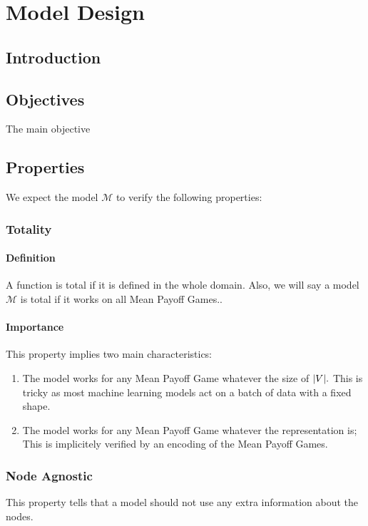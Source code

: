 \chapter{Model Design}
\label{section:ModelDesign}

\section{Introduction}

\section{Objectives}
The main objective

\section{Properties}
\label{section:ModelDesign:Properties}
We expect the model $\mathcal{M}$ to verify the following properties:

\subsection{Totality}
\subsubsection{Definition}
A function is total if it is defined in the whole domain.
\newline Also, we will say a model $\mathcal{M}$ is total if it works on all Mean Payoff Games..
\subsubsection{Importance}
This property implies two main characteristics:
\begin{enumerate}
	\item The model works for any Mean Payoff Game whatever the size of $\lvert V \rvert.$ This is tricky as most machine learning models act on a batch of data with a fixed shape.
	\item The model works for any Mean Payoff Game whatever the representation is; This is implicitely verified by an encoding of the Mean Payoff Games.
\end{enumerate}

\subsection{Node Agnostic}
This property tells that a model should not use any extra information about the nodes.
